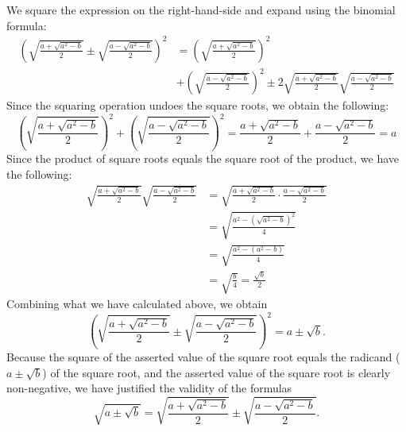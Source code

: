 \documentclass[12pt]{article}
\begin{document}
We square the expression on the right-hand-side and expand
using the binomial formula:
\begin{align*}
 \left(
  \sqrt{\frac{a+\sqrt{a^2-b}}{2}} \pm
  \sqrt{\frac{a-\sqrt{a^2-b}}{2}}
 \right)^2 &=
 \left( \sqrt{\frac{a+\sqrt{a^2-b}}{2}} \right)^2 \\ &+
 \left( \sqrt{\frac{a-\sqrt{a^2-b}}{2}} \right)^2 \pm 
 2 \sqrt{\frac{a+\sqrt{a^2-b}}{2}}
   \sqrt{\frac{a-\sqrt{a^2-b}}{2}}
\end{align*} 
Since the squaring operation undoes the square roots, we
obtain the following:
\[
 \left( \sqrt{\frac{a+\sqrt{a^2-b}}{2}} \right)^2 +
 \left( \sqrt{\frac{a-\sqrt{a^2-b}}{2}} \right)^2 =
 \frac{a+\sqrt{a^2-b}}{2} +
 \frac{a-\sqrt{a^2-b}}{2} = a
\] 
Since the product of square roots equals the square root
of the product, we have the following:
\begin{align*}
 \sqrt{\frac{a+\sqrt{a^2-b}}{2}}
 \sqrt{\frac{a-\sqrt{a^2-b}}{2}} &=
 \sqrt{\frac{a+\sqrt{a^2-b}}{2} \cdot
       \frac{a-\sqrt{a^2-b}}{2}} \\ &=
 \sqrt{\frac{a^2 - (\sqrt{a^2-b})^2}{4}} \\ &=
 \sqrt{\frac{a^2 - (a^2-b)}{4}} \\ &=
 \sqrt{\frac{b}{4}} = 
  \frac{\sqrt{b}}{2}
\end{align*}
Combining what we have calculated above, we obtain
\[
\left(
  \sqrt{\frac{a+\sqrt{a^2-b}}{2}} \pm
  \sqrt{\frac{a-\sqrt{a^2-b}}{2}}
 \right)^2 =
 a \pm \sqrt{b} .
\]
Because the square of the asserted value of the square root equals the radicand ($a\pm\sqrt{b}$) of the square root, and the asserted value of the square root is clearly non-negative, we have justified the validity of the formulas
\[
 \sqrt{a \pm \sqrt{b}} =
 \sqrt{\frac{a+\sqrt{a^2-b}}{2}} \pm
 \sqrt{\frac{a-\sqrt{a^2-b}}{2}}.
\]
\end{document}
